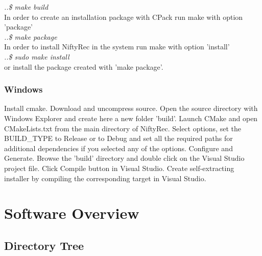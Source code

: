 \documentclass[12pt,a4paper]{report}
\begin{document}
   \emph {..\$ make build}\\

\noindent    In order to create an installation package with CPack run make with option 'package'\\

   \emph {..\$ make package}\\

\noindent    In order to install NiftyRec in the system run make with option 'install'\\

   \emph {..\$ sudo make install}\\

\noindent    or install the package created with 'make package'.

\subsubsection{Windows}
Install cmake. Download and uncompress source. Open the source directory 
with Windows Explorer and create here a new folder 'build'. Launch CMake 
and open CMakeLists.txt from the main directory of NiftyRec.
Select options, set the BUILD\_TYPE to Release or to Debug and set all the required 
paths for additional dependencies if you selected any of the options. 
Configure and Generate. Browse the 'build' directory and double click 
on the Visual Studio project file. Click Compile button in Visual Studio. 
Create self-extracting installer by compiling the corresponding target in Visual 
Studio. 

\section{Software Overview}

\subsection{Directory Tree}
\label{sec:directory_tree}
\end{document}
